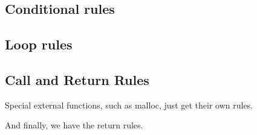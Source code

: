 \documentclass{article}
\begin{document}
\subsection{Conditional rules}

\conditionals

\subsection{Loop rules}

\loops
           
\subsection{Call and Return Rules}

\callexprstep
\callstep
\extcallstep

Special external functions, such as malloc, just get their own rules.

\mallocstep

And finally, we have the return rules.

\returnstep
\retvalstep
\retnovalstep
\end{document}
